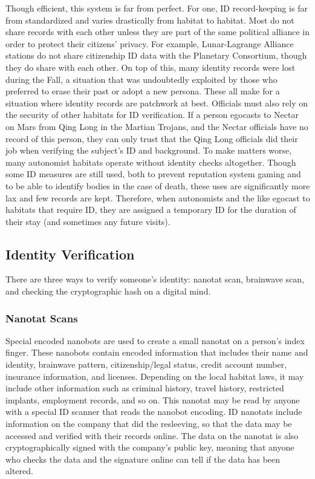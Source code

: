 Though efficient, this system is far from perfect. For 
one, ID record-keeping is far from standardized and 
varies drastically from habitat to habitat. Most do not 
share records with each other unless they are part of the 
same political alliance in order to protect their citizens' 
privacy. For example, Lunar-Lagrange Alliance stations 
do not share citizenship ID data with the Planetary 
Consortium, though they do share with each other. 
On top of this, many identity records were lost 
during the Fall, a situation that was undoubtedly exploited
by those who preferred to erase their past or
adopt a new persona. These all make for a situation 
where identity records are patchwork at best. Officials 
must also rely on the security of other habitats for ID 
verification. If a person egocasts to Nectar on Mars 
from Qing Long in the Martian Trojans, and the 
Nectar officials have no record of this person, they 
can only trust that the Qing Long officials did their 
job when verifying the subject's ID and background.
To make matters worse, many autonomist habitats 
operate without identity checks altogether. Though 
some ID measures are still used, both to prevent 
reputation system gaming and to be able to identify 
bodies in the case of death, these uses are significantly 
more lax and few records are kept. Therefore, when 
autonomists and the like egocast to habitats that require
ID, they are assigned a temporary ID for the duration
of their stay (and sometimes any future visits).

\subsection{Identity Verification}

There are three ways to verify someone's identity: 
nanotat scan, brainwave scan, and checking the cryptographic
hash on a digital mind.

\subsubsection{Nanotat Scans}

Special encoded nanobots are used to create a small 
nanotat on a person's index finger. These  nanobots 
contain encoded information that includes their name 
and identity, brainwave pattern, citizenship/legal status, 
credit account number, insurance information, and 
licenses. Depending on the local habitat laws, it may 
include other information such as criminal history, 
travel history, restricted implants, employment records, 
and so on. This nanotat may be read by anyone with 
a special ID scanner that reads the nanobot encoding.
ID nanotats include information on the company 
that did the resleeving, so that the data may be accessed
and verified with their records online. The data
on the nanotat is also cryptographically signed with 
the company's public key, meaning that anyone who 
checks the data and the signature online can tell if the 
data has been altered.

